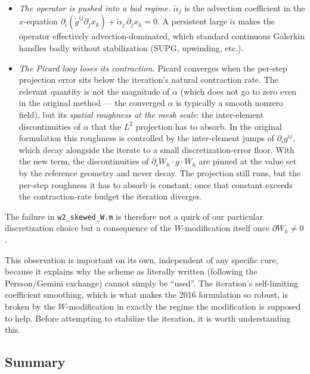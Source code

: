 \documentclass[11pt]{article}
\begin{document}
\begin{itemize}
  \item \emph{The operator is pushed into a bad regime.}
    $\tilde\alpha_j$ is the advection coefficient in the
    $x$-equation $\partial_i(\tilde g^{ij}\partial_j x_k)
     + \tilde\alpha_j\,\partial_j x_k = 0$. A persistent large
    $\tilde\alpha$ makes the operator effectively
    advection-dominated, which standard continuous Galerkin
    handles badly without stabilization (SUPG, upwinding, etc.).
  \item \emph{The Picard loop loses its contraction.} Picard
    converges when the per-step projection error sits below the
    iteration's natural contraction rate. The relevant quantity
    is not the magnitude of $\alpha$ (which does not go to zero
    even in the original method --- the converged $\alpha$ is
    typically a smooth nonzero field), but its
    \emph{spatial roughness at the mesh scale}: the inter-element
    discontinuities of $\alpha$ that the $L^2$ projection has to
    absorb. In the original formulation this roughness is
    controlled by the inter-element jumps of $\partial_i g^{ij}$,
    which decay alongside the iterate to a small
    discretization-error floor. With the new term, the
    discontinuities of $\partial_i W_h \cdot g \cdot W_h$ are
    pinned at the value set by the reference geometry and never
    decay. The projection still runs, but the per-step roughness
    it has to absorb is constant; once that constant exceeds the
    contraction-rate budget the iteration diverges.
\end{itemize}

The failure in \texttt{w2\_skewed\_W.m} is therefore not a quirk
of our particular discretization choice but a consequence of the
$W$-modification itself once $\partial W_h \neq 0$.

This observation is important on its own, independent of any
specific cure, because it explains why the scheme as literally
written (following the Persson/Gemini exchange) cannot simply be
``used''. The iteration's self-limiting coefficient smoothing,
which is what makes the 2016 formulation so robust, is broken by
the $W$-modification in exactly the regime the modification is
supposed to help. Before attempting to stabilize the iteration,
it is worth understanding this.

\subsection{Summary}
\label{sec:W-summary}
\end{document}
